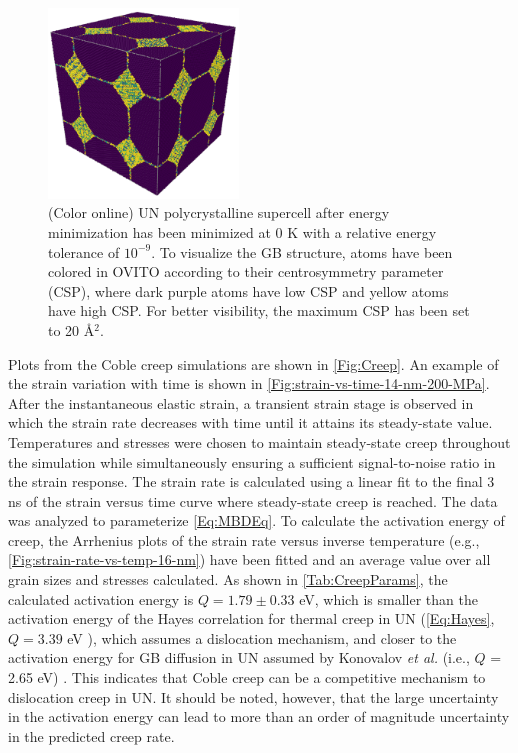 \documentclass[preprint,12pt,sort&compress]{elsarticle}
\newcommand{\?}{\stackrel{?}{=}}
\begin{document}
\begin{figure}[h]
    \centering
    \includegraphics[width=0.45\textwidth]{Structure.png}
    \caption{(Color online) UN polycrystalline supercell after energy minimization has been minimized at 0 K with a relative energy tolerance of $10^{-9}$. To visualize the GB structure, atoms have been colored in OVITO according to their centrosymmetry parameter (CSP), where dark purple atoms have low CSP and yellow atoms have high CSP. For better visibility, the maximum CSP has been set to 20 \AA$^{2}$.}
    \label{Fig:Structure}
\end{figure}

Plots from the Coble creep simulations are shown in \cref{Fig:Creep}. An example of the strain variation with time is shown in \cref{Fig:strain-vs-time-14-nm-200-MPa}. After the instantaneous elastic strain, a transient strain stage is observed in which the strain rate decreases with time until it attains its steady-state value. Temperatures and stresses were chosen to maintain steady-state creep throughout the simulation while simultaneously ensuring a sufficient signal-to-noise ratio in the strain response. The strain rate is calculated using a linear fit to the final 3 ns of the strain versus time curve where steady-state creep is reached. The data was analyzed to parameterize \cref{Eq:MBDEq}. To calculate the activation energy of creep, the Arrhenius plots of the strain rate versus inverse temperature (e.g., \cref{Fig:strain-rate-vs-temp-16-nm}) have been fitted and an average value over all grain sizes and stresses calculated. As shown in \cref{Tab:CreepParams}, the calculated activation energy is $Q = 1.79 \pm 0.33$ eV, which is smaller than the activation energy of the Hayes correlation for thermal creep in UN (\cref{Eq:Hayes}, $Q = 3.39$ eV \cite{Hayes1990II}), which assumes a dislocation mechanism, and closer to the activation energy for GB diffusion in UN assumed by Konovalov \textit{et al.} (i.e., $Q$ = 2.65 eV) \cite{Konovalov2016}. This indicates that Coble creep can be a competitive mechanism to dislocation creep in UN. It should be noted, however, that the large uncertainty in the activation energy can lead to more than an order of magnitude uncertainty in the predicted creep rate.
\end{document}
